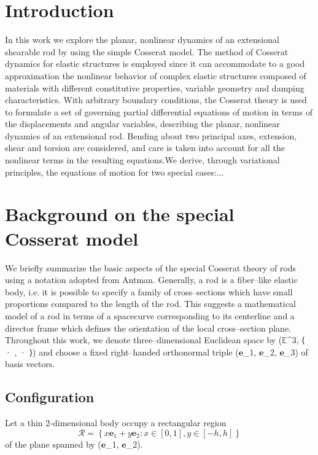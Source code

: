 \documentclass[12pt]{article}
\begin{document}
\section{Introduction}
In this work we explore the planar, nonlinear dynamics of an extensional shearable rod by using the simple Cosserat model. The method of Cosserat dynamics for elastic structures is employed since it can accommodate to a good approximation the nonlinear behavior of complex elastic structures composed of materials with different constitutive properties, variable geometry and damping characteristics. With arbitrary boundary conditions, the Cosserat theory is used to formulate a set of governing partial differential equations of motion in terms of the displacements and angular variables, describing the planar, nonlinear dynamics of an extensional rod. Bending about two principal axes, extension, shear and torsion are considered, and care is taken into account for all the nonlinear terms in the resulting equations.We derive, through variational principles, the equations of motion for two special cases:...

\section{Background on the special Cosserat model}
We briefly summarize the basic aspects of the special Cosserat theory of rods using a notation adopted from Antman. Generally, a rod is a fiber–like elastic body, i.e. it is possible to specify a family of cross–sections which have small proportions compared to the length of the rod. This suggests a mathematical model of a rod in terms of a spacecurve corresponding to its centerline and a director frame which defines the orientation of the local cross–section plane.
Throughout this work, we denote three–dimensional Euclidean space by ($\mathbb{E}$^3, ⟨ · , · ⟩) and choose a fixed right–handed orthonormal triple ($\mathbf{e}$_1, $\mathbf{e}$_2, $\mathbf{e}$_3) of basis vectors.

\subsection{Configuration}
Let a thin 2-dimensional body occupy a rectangular region
\[  \mathcal{R}= \left \{
x\mathbf{e}_1 + y\mathbf{e}_2: x\in[0,1] ,y\in[-h,h] 
\right \}\]
of the plane spanned by ($\mathbf{e}$_1, $\mathbf{e}$_2).\\
\end{document}
